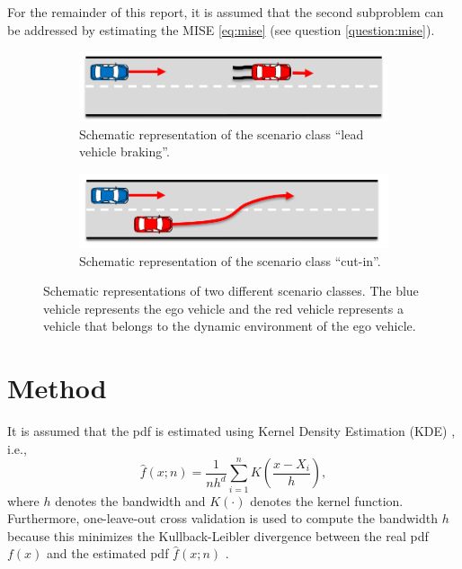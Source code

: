 \documentclass[10pt,final,a4paper,oneside,onecolumn]{article}
\theoremstyle{plain}\newtheorem{definition}{Definition}[section]    %
\theoremstyle{definition}\newtheorem{example}{Example}[section]     %
\theoremstyle{remark}\newtheorem{remarkenv}{Remark}[section]        %
\begin{document}
For the remainder of this report, it is assumed that the second subproblem can be addressed by estimating the MISE \cref{eq:mise} (see question \ref{question:mise}).

\begin{figure}
	\begin{subfigure}{\linewidth}
		\centering
		\includegraphics[scale=0.5]{"Scenario lead braking"}
		\caption{Schematic representation of the scenario class ``lead vehicle braking''.}
		\label{fig:lead vehicle braking}
	\end{subfigure}
	\begin{subfigure}{\linewidth}
		\centering
		\includegraphics[scale=0.5]{"Scenario cut-in"}
		\caption{Schematic representation of the scenario class ``cut-in''.}
		\label{fig:cut-in}
	\end{subfigure}
	\caption{Schematic representations of two different scenario classes. The blue vehicle represents the ego vehicle and the red vehicle represents a vehicle that belongs to the dynamic environment of the ego vehicle.}
	\label{fig:scenario classes}
\end{figure}



\section{Method}
\label{sec:method}

It is assumed that the pdf is estimated using Kernel Density Estimation (KDE) \cite{rosenblatt1956remarks, parzen1962estimation}, i.e.,
\begin{equation}
	\hat{f}(x;n) = \frac{1}{nh^d} \sum_{i=1}^n K \left( \frac{x - X_i}{h} \right),
\end{equation}
where $h$ denotes the bandwidth and $K(\cdot)$ denotes the kernel function. Furthermore, one-leave-out cross validation is used to compute the bandwidth $h$ because this minimizes the Kullback-Leibler divergence between the real pdf $f(x)$ and the estimated pdf $\hat{f}(x;n)$ \cite{turlach1993bandwidthselection}.
\end{document}
